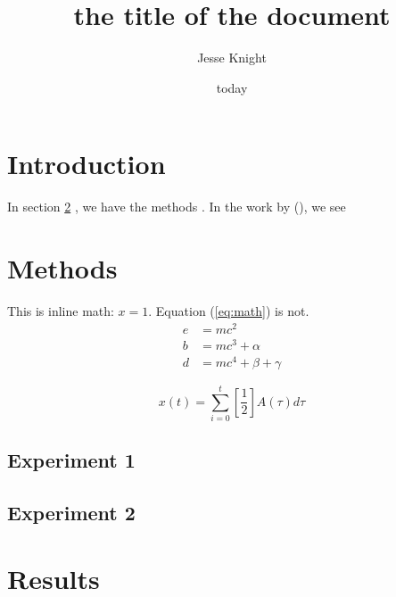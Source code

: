 \documentclass[12pt]{article}
\title{the title of the document}
\author{Jesse Knight}
\date{today}
\begin{document}
\maketitle

\section{Introduction}
In section \ref{s:methods} ,
we have the methods \parencite{Knight2019}.
In the work by \citeauthor{Knight2019} (\citeyear{Knight2019}),
we see

\section{Methods}\label{s:methods}
This is inline math: $x = 1$.
Equation (\ref{eq:math}) is not.
\begin{equation}
  \begin{aligned}
    e &= mc^2\\
    b &= mc^3 + \alpha\\
    d &= mc^4 + \beta + \gamma
    \label{eq:math}
  \end{aligned}
\end{equation}

\begin{equation}
  x(t) = \sum_{i=0}^{t} \left[\frac{1}{2}\right] A(\tau) d\tau
\end{equation}


\subsection{Experiment 1}
\subsection{Experiment 2}

\clearpage
\section{Results}
\end{document}
